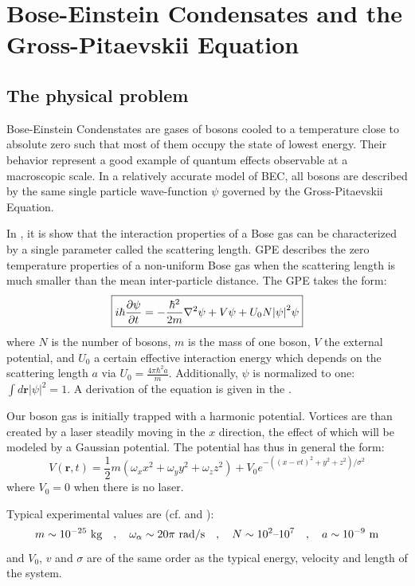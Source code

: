 \documentclass{article}
\begin{document}
\section{Bose-Einstein Condensates and the Gross-Pitaevskii Equation}\label{sec:BSEandGPE}
\subsection{The physical problem}
Bose-Einstein Condenstates are gases of bosons cooled to a temperature close to absolute zero such that most of them occupy the state of lowest energy. Their behavior represent a good example of quantum effects observable at a macroscopic scale. In a relatively accurate model of BEC, all bosons are described by the same single particle wave-function $\psi$ governed by the Gross-Pitaevskii Equation. \par
In \cite{Pethick}, it is show that the interaction properties of a Bose gas can be characterized by a single parameter called the scattering length. GPE describes the zero temperature properties of a non-uniform Bose gas when the scattering length is much smaller than the mean inter-particle distance. The GPE takes the form:
\begin{equation}\label{eqGP}
    \boxed{i\hbar \pdv{\psi}{t} = -\frac{\hbar^2}{2m} \laplacian \psi + V \psi + U_0 N \abs{\psi}^2 \psi}
\end{equation}
where $N$ is the number of bosons, $m$ is the mass of one boson, $V$ the external potential, and $U_0$ a certain effective interaction energy which depends on the scattering length $a$ via $U_0=\frac{4 \pi \hbar^2a}{m}$. Additionally, $\psi$ is normalized to one: $\int d\mathbf{r}|\psi|^2=1$. A derivation of the equation is given in the .


\bigskip
Our boson gas is initially trapped with a harmonic potential. Vortices are than created by a laser steadily moving in the $x$ direction, the effect of which will be modeled by a Gaussian potential. The potential has thus in general the form:
$$
V(\mathbf{r},t)=\frac{1}{2}m(\omega_x x^2+\omega_y y^2+\omega_z z^2)+V_0 e^{-\left((x-v t)^2+y^2+z^2\right)/\sigma^2}
$$
where $V_0=0$ when there is no laser.

\bigskip
Typical experimental values are (cf. \cite{bao1} and \cite{bao2}):
\begin{equation}\label{eqExpVal}
    m\sim10^{-25}\text{ kg}\quad,\quad
    \omega_\alpha\sim20\pi\text{ rad/s}\quad,\quad
    N\sim10^{2}\text{--}10^7\quad,\quad
    a\sim10^{-9}\text{ m}\\
\end{equation}
and $V_0$, $v$ and $\sigma$ are of the same order as the typical energy, velocity and length of the system.
\end{document}
